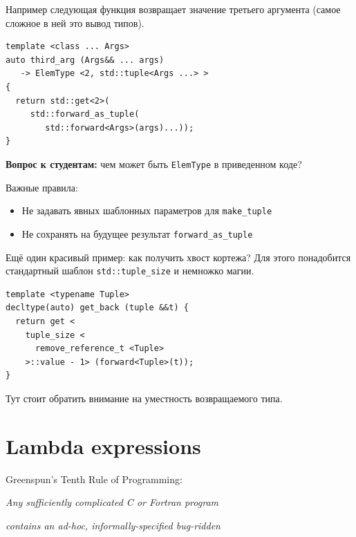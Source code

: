 \documentclass[a4paper,12pt,oneside]{book}
\newif\ifanswers
\begin{document}
Например следующая функция возвращает значение третьего аргумента (самое сложное в ней это вывод типов).

\begin{lstlisting}
template <class ... Args>
auto third_arg (Args&& ... args) 
   -> ElemType <2, std::tuple<Args ...> >
{
  return std::get<2>(
     std::forward_as_tuple(
        std::forward<Args>(args)...));
}
\end{lstlisting}

\textbf{Вопрос к студентам:} чем может быть \lstinline!ElemType! в приведенном коде?

\ifanswers
\lstinline!ElemType! это просто удобный синоним для сложного выводного типа:

\begin{lstlisting}
template <size_t i, class T>
using ElemType = decltype (
   std::get<i>(std::declval<T>()));
\end{lstlisting}
\fi

Важные правила: 

\begin{itemize}
\item Не задавать явных шаблонных параметров для \lstinline!make_tuple! 
\item Не сохранять на будущее результат \lstinline!forward_as_tuple!
\end{itemize}

Ещё один красивый пример: как получить хвост кортежа? Для этого понадобится стандартный шаблон \lstinline!std::tuple_size! и немножко магии.

\begin{lstlisting}
template <typename Tuple>
decltype(auto) get_back (tuple &&t) {
  return get < 
    tuple_size <
      remove_reference_t <Tuple>
    >::value - 1> (forward<Tuple>(t));
}
\end{lstlisting}

Тут стоит обратить внимание на уместность возвращаемого типа.

\pagebreak
\section{Lambda expressions}\label{LambdaExpressions}

\hfill{Greenspun's Tenth Rule of Programming:}

\hfill\textit{Any sufficiently complicated C or Fortran program}

\hfill\textit{contains an ad-hoc, informally-specified bug-ridden}
\end{document}
